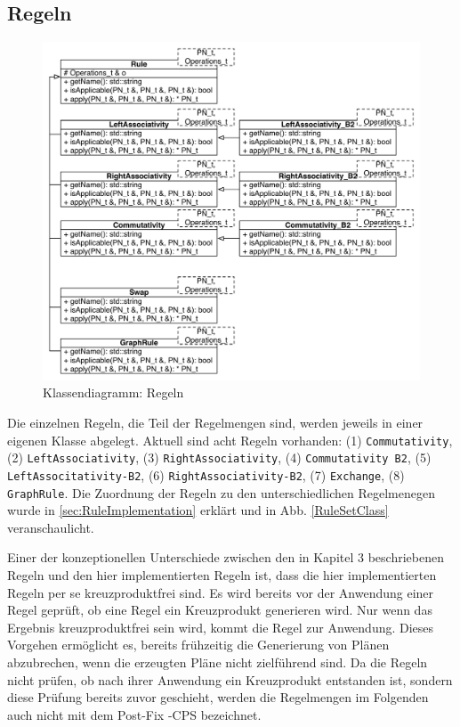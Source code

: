 \subsection{Regeln}

\begin{figure}[ht]
  \centering
  \includegraphics[scale=0.75]{04_Implementierung/00_media/Rules.pdf}
  \caption{Klassendiagramm: Regeln}
  \label{RuleClassDiagram}
\end{figure}

Die einzelnen Regeln, die Teil der Regelmengen sind, werden jeweils in einer eigenen Klasse abgelegt. Aktuell sind acht Regeln vorhanden: (1) \texttt{Commutativity}, (2) \texttt{Left\-Associativity}, (3) \texttt{Right\-Associativity}, (4) \texttt{Commu\-tativity B2}, (5) \texttt{Left\-Associtativity-B2}, (6) \texttt{Right\-Associativity-B2}, (7) \texttt{Exchange}, (8) \texttt{GraphRule}. Die Zuordnung der Regeln zu den unterschiedlichen Regelmenegen wurde in \ref{sec:RuleImplementation} erklärt und in Abb. \ref{RuleSetClass} veranschaulicht.

Einer der konzeptionellen Unterschiede zwischen den in Kapitel 3 beschriebenen Regeln und den hier implementierten Regeln ist, dass die hier implementierten Regeln per se kreuzproduktfrei sind. Es wird bereits vor der Anwendung einer Regel geprüft, ob eine Regel ein Kreuzprodukt generieren wird. Nur wenn das Ergebnis kreuzproduktfrei sein wird, kommt die Regel zur Anwendung. Dieses Vorgehen ermöglicht es,  bereits frühzeitig die Generierung von Plänen abzubrechen, wenn die erzeugten Pläne nicht zielführend sind. Da die Regeln nicht prüfen, ob nach ihrer Anwendung ein Kreuzprodukt entstanden ist, sondern diese Prüfung bereits zuvor geschieht, werden die Regelmengen im Folgenden auch nicht mit dem Post-Fix -CPS bezeichnet.

